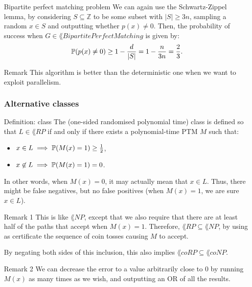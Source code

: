 \documentclass[a4paper]{article}
\begin{document}
\begin{parag}{Bipartite perfect matching problem}
    We can again use the Schwartz-Zippel lemma, by considering $S \subseteq \mathbb{Z}$ to be some subset with $\left|S\right| \geq 3n$, sampling a random $x \in S$ and outputting whether $p\left(x\right) \neq 0$. Then, the probability of success when $G \in \lang{BipartitePerfectMatching}$ is given by: 
    \[\prob\left(p\left(x\right) \neq 0\right) \geq 1 - \frac{d}{\left|S\right|} = 1 - \frac{n}{3n} = \frac{2}{3}.\]
    


    \begin{subparag}{Remark}
        This algorithm is better than the deterministic one when we want to exploit parallelism.
    \end{subparag}
\end{parag}

\subsubsection{Alternative classes}

\begin{parag}{Definition:  class}
    The  (one-sided randomised polynomial time) class is defined so that $L \in \lang{RP}$ if and only if there exists a polynomial-time PTM $M$ such that:
    \begin{itemize}
        \item $x \in L \implies \prob\left(M\left(x\right) = 1\right) \geq \frac{1}{2}$,
        \item $x \not \in L \implies \prob\left(M\left(x\right) = 1\right) = 0$.
    \end{itemize}

    In other words, when $M\left(x\right) = 0$, it may actually mean that $x \in L$. Thus, there might be false negatives, but no false positives (when $M\left(x\right) = 1$, we are sure $x \in L$).

    \begin{subparag}{Remark 1}
        This is like $\lang{NP}$, except that we also require that there are at least half of the paths that accept when $M\left(x\right) = 1$. Therefore, $\lang{RP} \subseteq \lang{NP}$, by using as certificate the sequence of coin tosses causing $M$ to accept.

        By negating both sides of this inclusion, this also implies $\lang{coRP} \subseteq \lang{coNP}$.
    \end{subparag}

    \begin{subparag}{Remark 2}
        We can decrease the error to a value arbitrarily close to $0$ by running $M\left(x\right)$ as many times as we wish, and outputting an OR of all the results.
    \end{subparag}
\end{parag}
\end{document}
